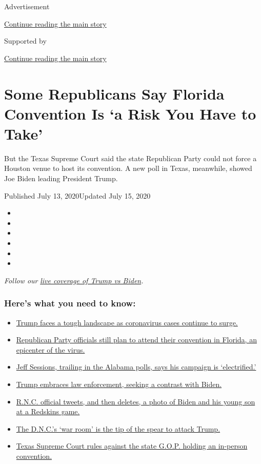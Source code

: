 Advertisement

\protect\hyperlink{after-top}{Continue reading the main story}

Supported by

\protect\hyperlink{after-sponsor}{Continue reading the main story}

\hypertarget{some-republicans-say-florida-convention-is-a-risk-you-have-to-take}{%
\section{Some Republicans Say Florida Convention Is `a Risk You Have to
Take'}\label{some-republicans-say-florida-convention-is-a-risk-you-have-to-take}}

But the Texas Supreme Court said the state Republican Party could not
force a Houston venue to host its convention. A new poll in Texas,
meanwhile, showed Joe Biden leading President Trump.

Published July 13, 2020Updated July 15, 2020

\begin{itemize}
\item
\item
\item
\item
\item
\item
\end{itemize}

\emph{Follow our}
\href{https://www.nytimes.com/2020/07/15/us/elections/biden-vs-trump.html}{\emph{live
coverage of Trump vs Biden}}\emph{.}

\hypertarget{heres-what-you-need-to-know}{%
\subsubsection{Here's what you need to
know:}\label{heres-what-you-need-to-know}}

\begin{itemize}
\tightlist
\item
  \protect\hyperlink{link-31e917b9}{Trump faces a tough landscape as
  coronavirus cases continue to surge.}
\item
  \protect\hyperlink{link-58c788d}{Republican Party officials still plan
  to attend their convention in Florida, an epicenter of the virus.}
\item
  \protect\hyperlink{link-38bdfe3}{Jeff Sessions, trailing in the
  Alabama polls, says his campaign is `electrified.'}
\item
  \protect\hyperlink{link-3872767b}{Trump embraces law enforcement,
  seeking a contrast with Biden.}
\item
  \protect\hyperlink{link-1faec578}{R.N.C. official tweets, and then
  deletes, a photo of Biden and his young son at a Redskins game.}
\item
  \protect\hyperlink{link-35e41aa8}{The D.N.C.'s `war room' is the tip
  of the spear to attack Trump.}
\item
  \protect\hyperlink{link-2becdc34}{Texas Supreme Court rules against
  the state G.O.P. holding an in-person convention.}
\end{itemize}

